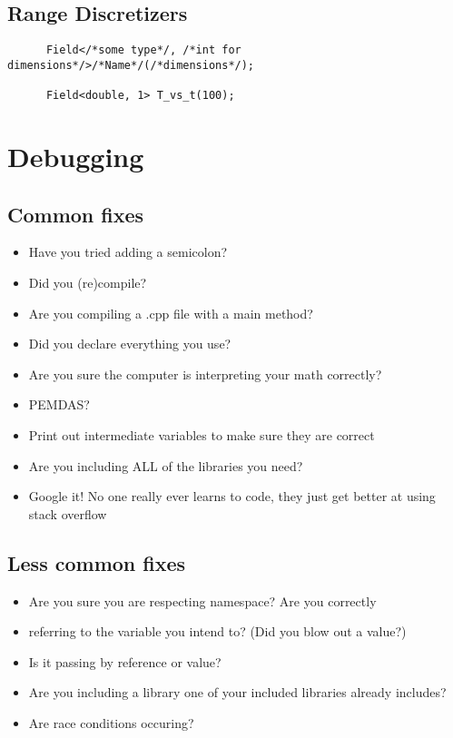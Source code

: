 \documentclass[12pt]{article}
\begin{document}
  \subsection{Range Discretizers}
    \begin{lstlisting}
      Field</*some type*/, /*int for dimensions*/>/*Name*/(/*dimensions*/);

      Field<double, 1> T_vs_t(100);
    \end{lstlisting}
\section{Debugging}
  \subsection{Common fixes}
    \begin{itemize}
      \item Have you tried adding a semicolon?
      \item Did you (re)compile?
      \item Are you compiling a .cpp file with a main method?
      \item Did you declare everything you use?
      \item Are you sure the computer is interpreting your math correctly?
      \item PEMDAS?
      \item Print out intermediate variables to make sure they are correct
      \item Are you including ALL of the libraries you need?
      \item Google it! No one really ever learns to code, they just get
      better at using stack overflow
    \end{itemize}
  \subsection{Less common fixes}
    \begin{itemize}
      \item Are you sure you are respecting namespace? Are you correctly
      \item referring to the variable you intend to? (Did you blow out a
      value?)
      \item Is it passing by reference or value?
      \item Are you including a library one of your included libraries already
    includes?
      \item Are race conditions occuring?
    \end{itemize}
\end{document}
